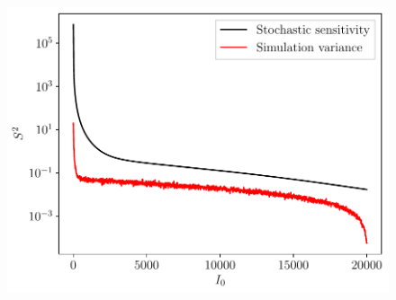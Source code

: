 \begin{figure}
	\begin{center}
		\includegraphics[width=\textwidth]{chp06_applications/figures/seihfr/seihfr_s2.pdf}
		\caption{}
		\label{fig:}
	\end{center}
\end{figure}
